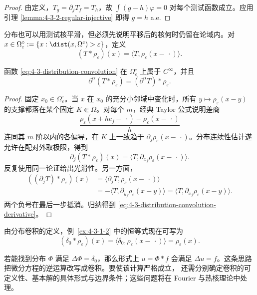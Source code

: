 \begin{proof}
由定义，$T_g=\partial_jT_f=T_h$，故
$\int(g-h)\varphi=0$ 对每个测试函数成立。应用引理
\ref{lemma:4-3-2-regular-injective} 即得 $g=h$ a.e.
\end{proof}

分布也可以用测试核平滑，但必须先说明平移后的核何时仍留在论域内。对
$x\in\Omega_\varepsilon^\circ:=\{x:\dist(x,\Omega^c)>\varepsilon\}$，定义
\[
 (T*\rho_\varepsilon)(x)
 =\langle T,\rho_\varepsilon(x-\,\cdot)\rangle.
 \tag{4.3.6}\label{eq:4-3-distribution-convolution}
\]

\begin{proposition}[卷积与分布导数]\label{proposition:4-3-2-3}
函数 \eqref{eq:4-3-distribution-convolution} 在 $\Omega_\varepsilon^\circ$ 上属于
$C^\infty$，并且
\[
 \partial^\alpha(T*\rho_\varepsilon)
 = (\partial^\alpha T)*\rho_\varepsilon.
 \tag{4.3.7}\label{eq:4-3-distribution-convolution-derivative}
\]
\end{proposition}

\begin{proof}
固定 $x_0\in\Omega_\varepsilon^\circ$。当 $x$ 在 $x_0$ 的充分小邻域中变化时，所有
$y\mapsto\rho_\varepsilon(x-y)$ 的支撑都落在某个固定 $K\Subset\Omega$。对每个 $m$，经典
Taylor 公式说明差商
\[
 \frac{\rho_\varepsilon(x+he_j-\,\cdot)-
       \rho_\varepsilon(x-\,\cdot)}h
\]
连同其 $m$ 阶以内的各偏导，在 $K$ 上一致趋于
$\partial_j\rho_\varepsilon(x-\,\cdot)$。分布连续性估计遂允许在配对外取极限，得到
\[
 \partial_j(T*\rho_\varepsilon)(x)
 =\langle T,\partial_{x_j}\rho_\varepsilon(x-\,\cdot)\rangle.
\]
反复使用同一论证给出光滑性。另一方面，
\begin{align*}
 ((\partial_jT)*\rho_\varepsilon)(x)
 &=\langle\partial_jT,\rho_\varepsilon(x-\,\cdot)\rangle\\
 &=-\langle T,\partial_{y_j}\rho_\varepsilon(x-y)\rangle
 =\langle T,\partial_{x_j}\rho_\varepsilon(x-y)\rangle.
\end{align*}
两个负号在最后一步抵消。归纳得到 \eqref{eq:4-3-distribution-convolution-derivative}。
\end{proof}

由分布卷积的定义，例~\ref{ex:4-3-1-2} 中的恒等式现在可写为
\[
 (\delta_0*\rho_\varepsilon)(x)
 =\langle\delta_0,\rho_\varepsilon(x-\,\cdot)\rangle
 =\rho_\varepsilon(x).
\]

\begin{remark}[基本解的卷积形式]\label{ex:4-3-2-3}
若能找到分布 $\Phi$ 满足 $\Delta\Phi=\delta_0$，那么形式上
$u=\Phi*f$ 会满足 $\Delta u=f$。这条思路把微分方程的逆运算改写成卷积。要使该计算严格成立，
还需分别确定卷积的可定义性、基本解的具体形式与边界条件；这些问题将在 Fourier 与热核理论中处理。
\end{remark}

